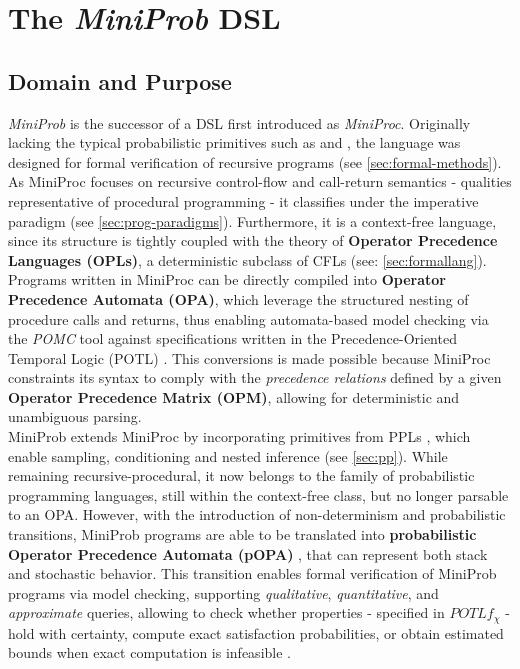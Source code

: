 \label{sec:miniprob}
\chapter{The \textit{MiniProb} DSL}
\section{Domain and Purpose}
\textit{MiniProb} is the successor of a DSL first introduced as \textit{MiniProc}\cite{miniproc}. Originally lacking the typical probabilistic
primitives such as  and , the language was designed for formal verification of recursive programs (see \ref{sec:formal-methods}). As MiniProc focuses on recursive control-flow and
call-return semantics - qualities representative of procedural programming - it classifies under the imperative paradigm (see \ref{sec:prog-paradigms}). Furthermore, it is a
context-free language, since its structure is tightly coupled with the theory of \textbf{Operator Precedence Languages (OPLs)}, a deterministic subclass of CFLs (see: \ref{sec:formallang}).
Programs written in MiniProc can be directly compiled into \textbf{Operator Precedence Automata (OPA)}, which leverage the structured nesting of procedure calls and
returns, thus enabling automata-based model checking via the \textit{POMC} tool against specifications written in the Precedence-Oriented Temporal Logic (POTL) \cite{miniproc}.
This conversions is made possible because MiniProc constraints its syntax to comply with the \textit{precedence relations} defined by a given
\textbf{Operator Precedence Matrix (OPM)}, allowing for deterministic and unambiguous parsing.
\\

MiniProb extends MiniProc by incorporating primitives from PPLs \cite{POPACheck}, which enable sampling, conditioning and nested inference (see \ref{sec:pp}).
While remaining recursive-procedural, it now belongs to the family of probabilistic programming languages, still within the context-free class, but no longer parsable to an OPA.
However, with the introduction of non-determinism and probabilistic transitions, MiniProb programs are able to be translated into
\textbf{probabilistic Operator Precedence  Automata (pOPA)} \cite{POPACheck,2025modelcheckingprobabilisticoperator}, that can represent both stack and stochastic behavior.
This transition enables formal verification of MiniProb programs via model checking, supporting \emph{qualitative}, \emph{quantitative}, and \emph{approximate} queries,
allowing to check whether properties - specified in $POTLf_\chi$ - hold with certainty, compute exact satisfaction probabilities, or obtain estimated bounds when exact computation is infeasible \cite{guideMiniProb}.

